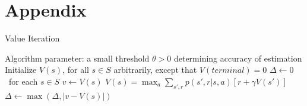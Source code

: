 \documentclass[11pt]{article} %
\begin{document}



\section{Appendix}

\begin{algorithm}
  \caption{Value Iteration}

  \State Algorithm parameter: a small threshold $\theta > 0$ determining accuracy of estimation
  \State Initialize $V(s)$, for all $s \in S$ arbitrarily, except that $V(terminal) = 0$
  \State
  \While{$\Delta > \theta$}
    \State $\Delta \leftarrow 0$
    \Loop \ for each $s \in S$
      \State $v \leftarrow V(s)$
      \State $ V(s) = \max_a \sum_{s',r} p(s',r|s,a) \left[ r + \gamma V(s') \right] $
      \State $\Delta \leftarrow \max(\Delta, |v - V(s)|)$
    \EndLoop
  \EndWhile

\end{algorithm}
\end{document}
